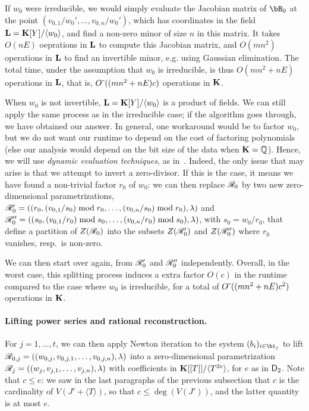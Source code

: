 \documentclass[12pt]{article}
\begin{document}
If $w_0$ were irreducible, we would simply evaluate the Jacobian
matrix of $\bB_0$ at the point $(v_{0,1}/w_0',\dots,v_{0,n}/w_0')$,
which has coordinates in the field $\mathbf{L}=\mathbf{K}[Y]/\langle w_0 \rangle$,
and find a non-zero minor of size $n$ in this matrix. It takes
$O(n E)$ oeprations in $\mathbf{L}$ to compute this Jacobian matrix, and
$O(mn^2)$ operations in $\mathbf{L}$ to find an invertible minor, e.g. using
Gaussian elimination. The total time, under the assumption that $w_0$
is irreducible, is thus $O(mn^2 + nE)$ operations in $\mathbf{L}$, that is,
${O}{\,\tilde{ }\,}( (mn^2 + nE) c)$ operations in $\mathbf{K}$.

When $w_0$ is not invertible, $\mathbf{L}=\mathbf{K}[Y]/\langle w_0 \rangle$ is a
product of fields. We can still apply the same process as in the
irreducible case; if the algorithm goes through, we have obtained our
answer. In general, one workaround would be to factor $w_0$, but we do
not want our runtime to depend on the cost of factoring polynomials
(else our analysis would depend on the bit size of the data when
$\mathbf{K}=\mathbb{Q}$). Hence, we will use {\em dynamic evaluation
  techniques}, as in~\cite{D5}. Indeed, the only issue that may arise
is that we attempt to invert a zero-divisor. If this is the case, it
means we have found a non-trivial factor $r_0$ of $w_0$: we can then
replace $\mathscr{R}_0$ by two new zero-dimensional parametrizations,
$\mathscr{R}'_0=((r_0,(v_{0,1}/s_0) \bmod r_0,\dots,(v_{0,n}/s_0)\bmod
r_0),\lambda)$
and
$\mathscr{R}''_0=((s_0,(v_{0,1}/r_0) \bmod s_0,\dots,(v_{0,n}/ r_0)\bmod
s_0),\lambda)$,
with $s_0=w_0/r_0$, that define a partition of $Z(\mathscr{R}_0)$ into the
subsets $Z(\mathscr{R}'_0)$ and $Z(\mathscr{R}''_0)$ where $r_0$ vanishes, resp.\
is non-zero.

We can then start over again, from $\mathscr{R}'_0$ and $\mathscr{R}''_0$
independently. Overall, in the worst case, this splitting process
induces a extra factor $O(c)$ in the runtime compared to the case
where $w_0$ is irreducible, for a total of ${O}{\,\tilde{ }\,}( (mn^2 + nE) c^2)$
operations in $\mathbf{K}$.

\paragraph{Lifting power series and rational reconstruction.}
For $j=1,\dots,t$, we can then apply Newton iteration to the system
$(b_i)_{i \in \bi_j}$ to lift
$\mathscr{R}_{0,j}=((w_{0,j},v_{0,j,1},\dots,v_{0,j,n}),\lambda)$ into a
zero-dimensional parametrization
$\mathscr{R}_{j}=((w_{j},v_{j,1},\dots,v_{j,n}),\lambda)$ with coefficients
in $\mathbf{K}[[T]]/\langle T^{2e}\rangle$, for $e$ as in ${\mathsf{D}}_2$.  Note
that $c \le e$: we saw in the last paragraphs of the previous
subsection that $c$ is the cardinality of $V(J' + \langle T \rangle)$,
so that $c \le \deg(V(J'))$, and the latter quantity is at most $e$.
\end{document}

